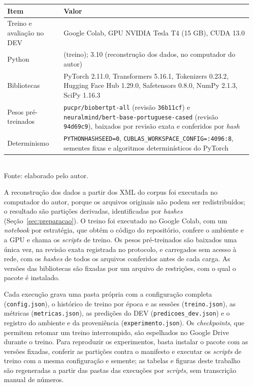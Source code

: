 \begin{quadro}[htbp]
  \centering
  \caption{Ambientes de execução e versões das principais bibliotecas.}
  \label{quad:ambiente}
  \small
  \begin{tabular}{l >{\raggedright\arraybackslash}p{9.4cm}}
  \toprule
  Item & Valor \\
  \midrule
  Treino e avaliação no DEV & Google Colab, GPU NVIDIA Tesla T4 (15 GB), CUDA 13.0 \\
  Python & 3.13 (treino); 3.10 (reconstrução dos dados, no computador do autor) \\
  Bibliotecas & PyTorch 2.11.0, Transformers 5.16.1, Tokenizers 0.23.2, Hugging Face Hub 1.29.0, Safetensors 0.8.0, NumPy 2.1.3, SciPy 1.16.3 \\
  Pesos pré-treinados & \texttt{pucpr/biobertpt-all} (revisão \texttt{36b11cf}) e \texttt{neuralmind/\allowbreak bert-base-portuguese-cased} (revisão \texttt{94d69c9}), baixados por revisão exata e conferidos por \emph{hash} \\
  Determinismo & \texttt{PYTHONHASHSEED=0}, \texttt{CUBLAS\_WORKSPACE\_CONFIG=:4096:8}, sementes fixas e algoritmos determinísticos do PyTorch \\
  \bottomrule
  \end{tabular}\\[4pt]
  {\footnotesize Fonte: elaborado pelo autor.}
\end{quadro}

A reconstrução dos dados a partir dos XML do corpus foi executada no
computador do autor, porque os arquivos originais não podem ser redistribuídos; o
resultado são partições derivadas, identificadas por \emph{hashes}
(Seção~\ref{sec:preparacao}). O treino foi executado no Google Colab, com
um \emph{notebook} por estratégia, que obtém o código do repositório, confere o
ambiente e a GPU e chama os \emph{scripts} de treino. Os pesos pré-treinados são
baixados uma única vez, na revisão exata registrada no protocolo, e carregados sem
acesso à rede, com os \emph{hashes} de todos os arquivos conferidos antes de cada
carga. As versões das bibliotecas são fixadas por um arquivo de restrições, com o
qual o pacote é instalado.

Cada execução grava uma pasta própria com a configuração completa
(\texttt{config.json}), o histórico de treino por época e as sessões
(\texttt{treino.json}), as métricas (\texttt{metricas.json}), as predições do DEV
(\texttt{predicoes\_dev.json}) e o registro do ambiente e da proveniência
(\texttt{experimento.json}). Os \emph{checkpoints}, que permitem retomar um treino
interrompido, são espelhados no Google Drive durante o treino. Para reproduzir os
experimentos, basta instalar o pacote com as versões fixadas, conferir as partições
contra o manifesto e executar os \emph{scripts} de treino com a mesma configuração e
semente; as tabelas e figuras deste trabalho são regeneradas a partir das pastas das
execuções por \emph{scripts}, sem transcrição manual de números.

